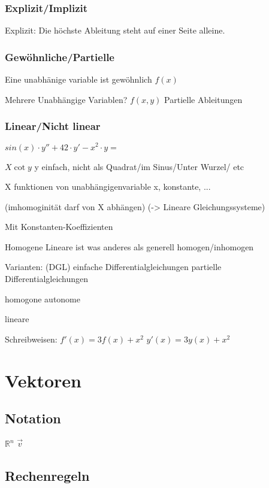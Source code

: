 \documentclass[10pt,a4paper]{article}
\begin{document}
\subsubsection{Explizit/Implizit}
	Explizit: Die höchste Ableitung steht auf einer Seite alleine.
	
	
\subsubsection{Gewöhnliche/Partielle}
	Eine unabhänige variable ist gewöhnlich
	$f(x)$

	Mehrere Unabhängige Variablen?
	$f(x,y)$
	Partielle Ableitungen
	
	
\subsubsection{Linear/Nicht linear}

	$sin(x) \cdot y'' + 42 \cdot y' - x^2 \cdot y = $
	
	$ X \cot y $
	y einfach, nicht als Quadrat/im Sinus/Unter Wurzel/ etc
	
	X funktionen von unabhängigenvariable x, konstante, ...
	
	(imhomoginität darf von X abhängen)
	(-> Lineare Gleichungssysteme)
	
	Mit Konstanten-Koeffizienten
	
	
	Homogene Lineare 
	ist was anderes als generell homogen/inhomogen
	



Varianten:
	(DGL)
	einfache Differentialgleichungen
	partielle Differentialgleichungen

	homogone autonome
	
	lineare
	
Schreibweisen:
	$ f'(x) = 3f(x) + x^2 $
	$ y'(x) = 3y(x) + x^2 $
	

\section{Vektoren}

\subsection{Notation}
$\mathbb{R}^{n}$
$\vec{v}$

\subsection{Rechenregeln}
% 
\end{document}
